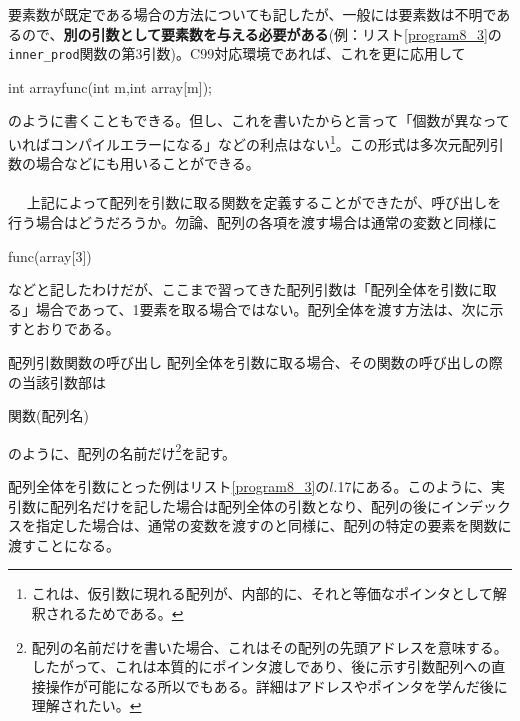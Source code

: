 要素数が既定である場合の方法についても記したが、一般には要素数は不明であるので、\textbf{別の引数として要素数を与える必要がある}(例：リスト\ref{program8_3}の\verb|inner_prod|関数の第3引数)。C99対応環境であれば、これを更に応用して
\begin{code}
int arrayfunc(int m,int array[m]);
\end{code}
のように書くこともできる。但し、これを書いたからと言って「個数が異なっていればコンパイルエラーになる」などの利点はない\footnote{これは、仮引数に現れる配列が、内部的に、それと等価なポインタとして解釈されるためである。}。この形式は多次元配列引数の場合などにも用いることができる。
\\ \\　
上記によって配列を引数に取る関数を定義することができたが、呼び出しを行う場合はどうだろうか。勿論、配列の各項を渡す場合は通常の変数と同様に
\begin{code}
func(array[3])
\end{code}
などと記したわけだが、ここまで習ってきた配列引数は「配列全体を引数に取る」場合であって、1要素を取る場合ではない。配列全体を渡す方法は、次に示すとおりである。
\begin{itembox}[l]{配列引数関数の呼び出し}
配列全体を引数に取る場合、その関数の呼び出しの際の当該引数部は
\begin{code}
関数(配列名)
\end{code}
のように、配列の名前だけ\footnote{配列の名前だけを書いた場合、これはその配列の先頭アドレスを意味する。したがって、これは本質的にポインタ渡しであり、後に示す引数配列への直接操作が可能になる所以でもある。詳細はアドレスやポインタを学んだ後に理解されたい。}を記す。
\end{itembox}

配列全体を引数にとった例はリスト\ref{program8_3}の$l$.17にある。このように、実引数に配列名だけを記した場合は配列全体の引数となり、配列の後にインデックスを指定した場合は、通常の変数を渡すのと同様に、配列の特定の要素を関数に渡すことになる。


